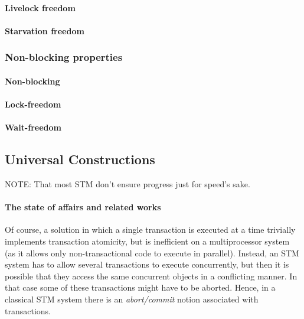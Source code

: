 \paragraph{Livelock freedom}
\paragraph{Starvation freedom}


\subsubsection{Non-blocking properties}
\paragraph{Non-blocking}
\paragraph{Lock-freedom}
\paragraph{Wait-freedom}


\subsection{Universal Constructions}

NOTE: That most STM don't ensure progress just for speed's sake.

\paragraph{The state of affairs and  related works}
Of course, a solution in which a single transaction is executed at a time 
trivially implements transaction atomicity, but is inefficient
on a multiprocessor system (as it allows only non-transactional code 
 to execute in parallel).   Instead, an STM system has to allow 
several transactions to execute  concurrently, but then it is possible that
they access the same concurrent objects in a conflicting manner.
In that case
some  of  these  transactions might  have  to   be  aborted. Hence,  in  a
classical  STM system    there    is  an    {\it   abort/commit}    notion
associated   with transactions. 

